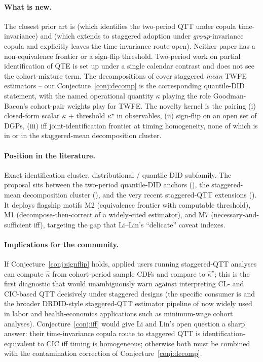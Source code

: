 \documentclass[11pt]{article}
\theoremstyle{definition}
\theoremstyle{plain}
\theoremstyle{remark}
\begin{document}
\paragraph{What is new.} The closest prior art is \cite{CallawayLi2019} (which identifies the two-period QTT under copula time-invariance) and \cite{LiLin2024} (which extends to staggered adoption under \emph{group}-invariance copula and explicitly leaves the time-invariance route open). Neither paper has a non-equivalence frontier or a sign-flip threshold. Two-period work \cite{FanYu2012} on partial identification of QTE is set up under a single calendar contrast and does not see the cohort-mixture term. The decompositions of \cite{GoodmanBacon2021,SunAbraham2021,deChaisemartinDHaultfoeuille2020} cover staggered \emph{mean} TWFE estimators -- our Conjecture~\ref{conj:decomp} is the corresponding quantile-DID statement, with the named operational quantity $\kappa$ playing the role Goodman-Bacon's cohort-pair weights play for TWFE. The novelty kernel is the pairing (i) closed-form scalar $\kappa$ + threshold $\kappa^\star$ in observables, (ii) sign-flip on an open set of DGPs, (iii) iff joint-identification frontier at timing homogeneity, none of which is in \cite{AtheyImbens2006, CallawayLi2019, LiLin2024, FanYu2012} or in the staggered-mean decomposition cluster.

\paragraph{Position in the literature.} Exact identification cluster, distributional / quantile DID subfamily. The proposal sits between the two-period quantile-DID anchors (\cite{AtheyImbens2006,CallawayLi2019,FanYu2012}), the staggered-mean decomposition cluster (\cite{GoodmanBacon2021,SunAbraham2021,deChaisemartinDHaultfoeuille2020}), and the very recent staggered-QTT extensions (\cite{LiLin2024,Ciaccio2025}). It deploys flagship motifs M2 (equivalence frontier with computable threshold), M1 (decompose-then-correct of a widely-cited estimator), and M7 (necessary-and-sufficient iff), targeting the gap that Li--Lin's ``delicate'' caveat indexes.

\paragraph{Implications for the community.} If Conjecture~\ref{conj:signflip} holds, applied users running staggered-QTT analyses can compute $\hat\kappa$ from cohort-period sample CDFs and compare to $\hat\kappa^\star$; this is the first diagnostic that would unambiguously warn against interpreting CL- and CIC-based QTT decisively under staggered designs (the specific consumer is \cite{LiLin2024} and the broader DRDID-style staggered-QTT estimator pipeline of \cite{CallawayLi2019} now widely used in labor and health-economics applications such as minimum-wage cohort analyses). Conjecture~\ref{conj:iff} would give Li and Lin's open question a sharp answer: their time-invariance copula route to staggered QTT is identification-equivalent to CIC iff timing is homogeneous; otherwise both must be combined with the contamination correction of Conjecture~\ref{conj:decomp}.
\end{document}
